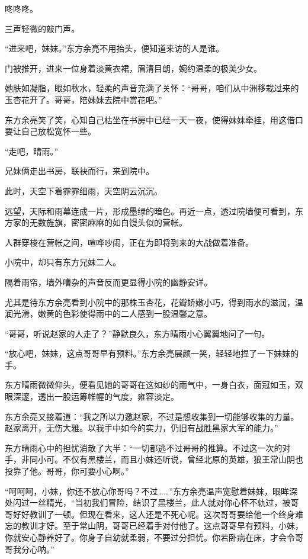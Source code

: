 \begin{this_body}
咚咚咚。

三声轻微的敲门声。

“进来吧，妹妹。”东方余亮不用抬头，便知道来访的人是谁。

门被推开，进来一位身着淡黄衣裙，眉清目朗，婉约温柔的极美少女。

她肤如凝脂，眼如秋水，轻柔的声音充满了关怀：“哥哥，咱们从中洲移栽过来的玉杏花开了。哥哥，陪妹妹去院中赏花吧。”

东方余亮笑了笑，心知自己枯坐在书房中已经一天一夜，使得妹妹牵挂，用这借口要让自己放松宽怀一些。

“走吧，晴雨。”

兄妹俩走出书房，联袂而行，来到院中。

此时，天空下着霏霏细雨，天空阴云沉沉。

远望，天际和雨幕连成一片，形成墨绿的暗色。再近一点，透过院墙便可看到，东方家的无数旌旗，密密麻麻的如白馒头似的营帐。

人群穿梭在营帐之间，喧哗吵闹，正在为即将到来的大战做着准备。

小院中，却只有东方兄妹二人。

隔着雨帘，墙外嘈杂的声音反而更显得小院的幽静安详。

尤其是待东方余亮看到小院中的那株玉杏花，花瓣娇嫩小巧，得到雨水的滋润，温润光滑，嫩黄的色彩使得雨中的二人感到一股温馨之意。

“哥哥，听说赵家的人走了？”静默良久，东方晴雨小心翼翼地问了一句。

“放心吧，妹妹，这点哥哥早有预料。”东方余亮展颜一笑，轻轻地捏了一下妹妹的手。

东方晴雨微微仰头，便看见她的哥哥在这如纱的雨气中，一身白衣，面冠如玉，双眼深邃，透出一股运筹帷幄的气度，雍容淡定。

东方余亮又接着道：“我之所以力邀赵家，不过是想收集到一切能够收集的力量。赵家离开，无伤大雅。以我手中如今的实力，仍旧有战胜黑家大军的能力。”

东方晴雨心中的担忧消散了大半：“一切都逃不过哥哥的推算。不过这一次的对手，非同小可。不仅有黑楼兰，而且小妹还听说，曾经北原的英雄，狼王常山阴也投靠了他。哥哥，你可要小心啊。”

“呵呵呵，小妹，你还不放心你哥吗？不过……”东方余亮温声宽慰着妹妹，眼眸深处闪过一丝精光，“当初我们冒险，结识了黑楼兰，此人就对你心怀不轨过，被哥哥好好教训了一顿。但现在看来，这人还是不死心呢。这次哥哥要给他一个终身难忘的教训才好。至于常山阴，哥哥已经着手对付他了。这点哥哥早有预料，小妹，你就安心静养好了。你身子自幼就柔弱，不要过分担忧。你若卧病在床，才会令哥哥我分心呐。”


\end{this_body}
